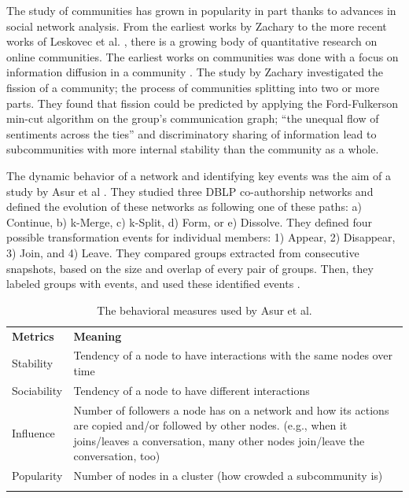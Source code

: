 \documentclass{acm_proc_article-sp}
\begin{document}
The study of communities has grown in popularity in part thanks to advances in social network analysis.  From the earliest works by Zachary \cite{Zachary} to the more recent works of Leskovec et al. \cite{LeskovecGraphsOverTime}\cite{LeskovecStatisticalPropertiesOfCommunityStructure}, there is a growing body of quantitative research on online communities. The earliest works on communities was done with a focus on information diffusion in a community \cite{Zachary}. The study by Zachary investigated the fission of a community; the process of communities splitting into two or more parts. They found that fission could be predicted by applying the Ford-Fulkerson min-cut algorithm \cite{Ford} on the group's communication graph; ``the unequal flow of sentiments across the ties'' and discriminatory sharing of information lead to subcommunities with more internal stability than the community as a whole.\cite{Zachary}

The dynamic behavior of a network and identifying key events was the aim of a study by Asur et al \cite{Asur}. They studied three DBLP co-authorship networks and defined the evolution of these networks as following one of these paths: a) Continue, b) k-Merge, c) k-Split, d) Form, or e) Dissolve. They defined four possible transformation events for individual members: 1) Appear, 2) Disappear, 3) Join, and 4) Leave. They compared groups extracted from consecutive snapshots, based on the size and overlap of every pair of groups. Then, they labeled groups with events, and used these identified events \cite{Asur}.

\begin{table}[!htbp]
\caption{The behavioral measures used by Asur et al. \cite{Asur}}
\label{tableDiversityMeasuresAsurEtAl} 
\begin{tabular}{p{} p{}}
\hline\noalign{\smallskip}
\textbf{Metrics} & \textbf{Meaning} \\
\noalign{\smallskip}\hline\noalign{\smallskip}
Stability & Tendency of a node to have interactions with the same nodes over time \\ \hline
Sociability & Tendency of a node to have different interactions \\\hline
Influence & Number of followers a node has on a network and how its actions are copied and/or followed by other nodes. (e.g., when it joins/leaves a conversation, many other nodes join/leave the conversation, too) \\\hline
Popularity & Number of nodes in a cluster (how crowded a subcommunity is) \\
\noalign{\smallskip}\hline
\end{tabular}
\end{table}
\end{document}
